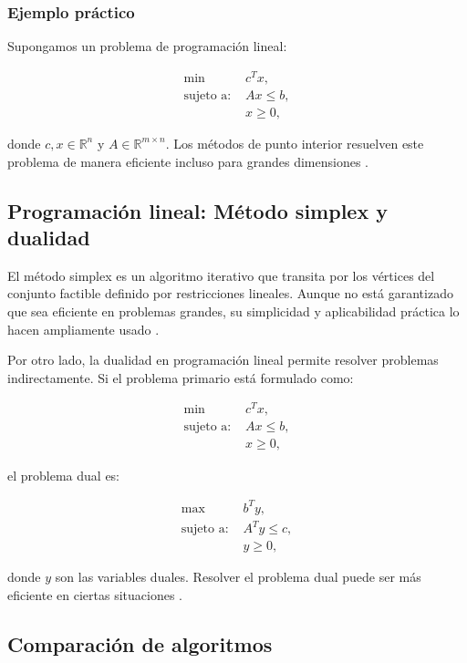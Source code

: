 \subsubsection{Ejemplo práctico}

Supongamos un problema de programación lineal:

\begin{align}
	\min \; & c^T x, \\
	\text{sujeto a: } & Ax \leq b, \\
	& x \geq 0,
\end{align}

donde \(c, x \in \mathbb{R}^n\) y \(A \in \mathbb{R}^{m \times n}\). Los métodos de punto interior resuelven este problema de manera eficiente incluso para grandes dimensiones \cite{boyd2004convex}.

\subsection{Programación lineal: Método simplex y dualidad}

El método simplex es un algoritmo iterativo que transita por los vértices del conjunto factible definido por restricciones lineales. Aunque no está garantizado que sea eficiente en problemas grandes, su simplicidad y aplicabilidad práctica lo hacen ampliamente usado \cite{nocedal1999optimization}.

Por otro lado, la dualidad en programación lineal permite resolver problemas indirectamente. Si el problema primario está formulado como:

\begin{align}
	\min \; & c^T x, \\
	\text{sujeto a: } & Ax \leq b, \\
	& x \geq 0,
\end{align}

el problema dual es:

\begin{align}
	\max \; & b^T y, \\
	\text{sujeto a: } & A^T y \leq c, \\
	& y \geq 0,
\end{align}

donde \(y\) son las variables duales. Resolver el problema dual puede ser más eficiente en ciertas situaciones \cite{boyd2004convex}.

\subsection{Comparación de algoritmos}

